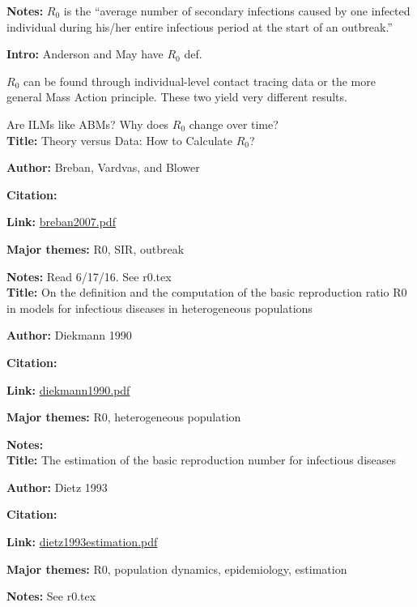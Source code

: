 \message{ !name(refs.tex)}\documentclass{article}
\begin{document}
\textbf{Notes:} $R_0$ is the ``average number of secondary infections caused by one infected individual during his/her entire infectious period at the start of an outbreak.''

\textbf{Intro:}  Anderson and May have $R_0$ def.

$R_0$ can be found through individual-level contact tracing data or the more general Mass Action principle.  These two yield very different results.

Are ILMs like ABMs?  Why does $R_0$ change over time?
\\

\textbf{Title:}  Theory versus Data:  How to Calculate $R_0$?

\textbf{Author:}  Breban, Vardvas, and Blower

\textbf{Citation:}\cite{breban2007}

\textbf{Link:} \url{breban2007.pdf}

\textbf{Major themes:}  R0, SIR, outbreak

\textbf{Notes:} Read 6/17/16.  See r0.tex\\

\textbf{Title:}  On the definition and the computation of the basic reproduction ratio R0 in models for infectious diseases in heterogeneous populations

\textbf{Author:} Diekmann 1990

\textbf{Citation:}\cite{diekmann1990}

\textbf{Link:} \url{diekmann1990.pdf}

\textbf{Major themes:}  R0, heterogeneous population

\textbf{Notes:}  
\\

\textbf{Title:}  The estimation of the basic reproduction number for infectious diseases

\textbf{Author:} Dietz 1993

\textbf{Citation:}\cite{dietz1993estimation}

\textbf{Link:} \url{dietz1993estimation.pdf}

\textbf{Major themes:}  R0, population dynamics, epidemiology, estimation

\textbf{Notes:}  See r0.tex
\\
\end{document}
